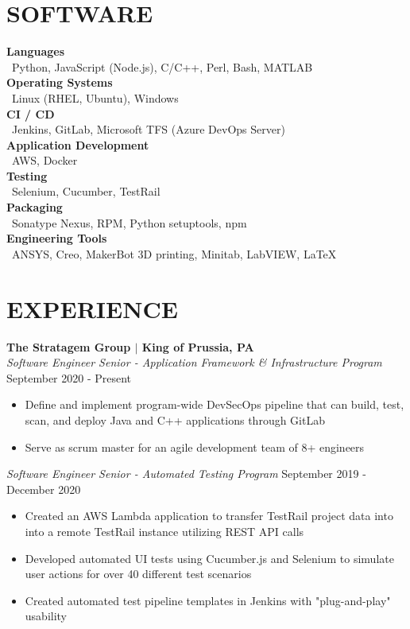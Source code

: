 \documentclass[line,resmargin,11pt]{res}
\begin{document}
\begin{resume}
\section{SOFTWARE}
\textbf{Languages} \\
\textbullet\ Python, JavaScript (Node.js), C/C++, Perl, Bash, MATLAB  \\
\textbf{Operating Systems} \\
\textbullet\ Linux (RHEL, Ubuntu), Windows \\
\textbf{CI / CD} \\
\textbullet\ Jenkins, GitLab, Microsoft TFS (Azure DevOps Server) \\
\textbf{Application Development} \\
\textbullet\ AWS, Docker \\
\textbf{Testing} \\
\textbullet\ Selenium, Cucumber, TestRail \\
\textbf{Packaging} \\
\textbullet\ Sonatype Nexus, RPM, Python setuptools, npm \\
\textbf{Engineering Tools} \\
\textbullet\ ANSYS, Creo, MakerBot 3D printing, Minitab, LabVIEW, \LaTeX        
 
\section{EXPERIENCE}
\textbf{The Stratagem Group $|$ King of Prussia, PA} \\
{\sl Software Engineer Senior - Application Framework \& Infrastructure Program} \hfill September 2020 - Present
	\begin{itemize} \itemsep -2pt %
		\item Define and implement program-wide DevSecOps pipeline that can build, test, scan, and deploy Java and C++ applications through GitLab
		\item Serve as scrum master for an agile development team of 8+ engineers
	\end{itemize}

{\sl Software Engineer Senior - Automated Testing Program} \hfill September 2019 - December 2020
	\begin{itemize} \itemsep -2pt %
		\item Created an AWS Lambda application to transfer TestRail project data into into a remote TestRail instance utilizing REST API calls
		\item Developed automated UI tests using Cucumber.js and Selenium to simulate user actions for over 40 different test scenarios
		\item Created automated test pipeline templates in Jenkins with "plug-and-play" usability
	\end{itemize}
	

\end{resume}
\end{document}
